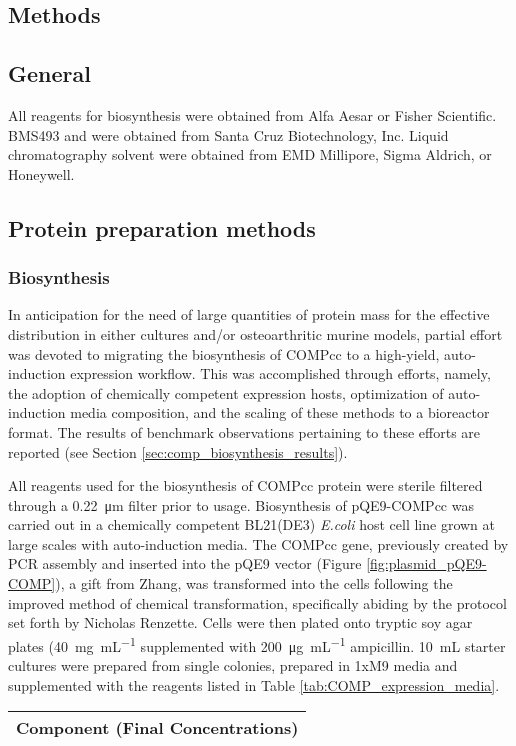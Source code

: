\begin{refsection}
\section{Methods}

\subsection{General}

All reagents for biosynthesis were obtained from Alfa Aesar or Fisher
Scientific. BMS493 and  were obtained from Santa
Cruz Biotechnology, Inc. Liquid chromatography solvent were obtained from EMD
Millipore, Sigma Aldrich, or Honeywell.

\subsection{Protein preparation methods}

\subsubsection{Biosynthesis}

In anticipation for the need of large quantities of protein mass for the
effective distribution in either  cultures and/or 
osteoarthritic murine models, partial effort was devoted to migrating the
biosynthesis of COMPcc to a high-yield, auto-induction expression workflow. This
was accomplished through efforts, namely, the adoption of 
chemically competent expression hosts,\cite{Renzette2011} optimization of auto-induction media
composition,\cite{Studier2005} and the scaling of these methods to a bioreactor format. The
results of benchmark observations pertaining to these efforts are reported (see
Section \ref{sec:comp_biosynthesis_results}).

All reagents used for the biosynthesis of COMPcc protein were sterile filtered
through a \SI{0.22}{\um} filter prior to usage. Biosynthesis of pQE9-COMPcc was
carried out in a chemically competent BL21(DE3) \emph{E.coli} host cell line
grown at large scales with auto-induction media.  The COMPcc gene, previously
created by PCR assembly and inserted into the pQE9 vector (Figure
\ref{fig:plasmid_pQE9-COMP}), a gift from Zhang,\cite{Shen2006a} was transformed
into the cells following the improved  method of chemical
transformation, specifically abiding by the protocol set forth by Nicholas
Renzette.\cite{Renzette2011} Cells were then plated onto tryptic soy agar plates
(\SI{40}{\mg\per\mL} supplemented with \SI{200}{\ug\per\mL} ampicillin.
\SI{10}{\mL} starter cultures were prepared from single colonies, prepared in
1xM9 media and supplemented with the reagents listed in Table
\ref{tab:COMP_expression_media}.
\begin{table}[h!]
    \centering
\begin{tabular}{ ll }
  \hline
  \multicolumn{2}{c}{Component (Final Concentrations)} \\
  \hline


\end{tabular}
\end{table}
\end{refsection}
